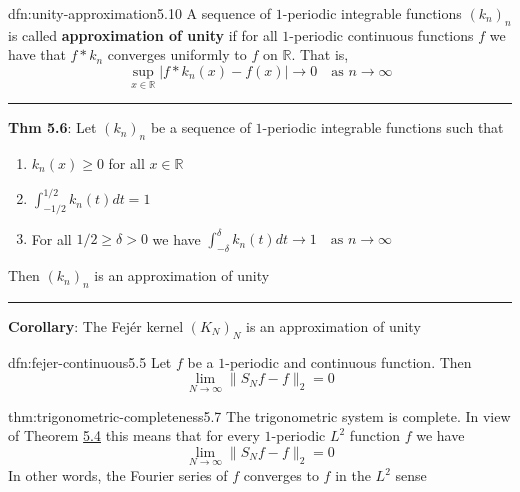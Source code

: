 \documentclass[landscape, 8pt]{extarticle}
\begin{document}
\begin{multicols}{3}
\vspace{-5pt}
\begin{dfn}{dfn:unity-approximation}{5.10}
	\vspace{-5pt}
	A sequence of $1$-periodic integrable functions $(k_{n})_{n}$ is called \textbf{approximation of unity} if for all $1$-periodic continuous functions $f$ we have that $f * k_{n}$ converges uniformly to $f$ on $\mathbb{R}$. That is,
	\[\sup_{x\in\mathbb{R}} \lvert f * k_{n}(x) - f(x) \rvert \to 0 \quad \text{as $n\to\infty$}\]

	\noindent\rule{\textwidth}{0.2pt}
	\textbf{Thm 5.6}: Let $(k_{n})_{n}$ be a sequence of $1$-periodic integrable functions such that
	\vspace{-5pt}
	\begin{enumerate}
	    \item $k_{n}(x) \ge 0$ for all $x\in\mathbb{R}$
	    \item $\int_{-1 /2}^{1 /2} k_{n}(t) dt = 1$
			\vspace{-8pt}
	    \item For all $1 /2 \ge \delta > 0$ we have $\displaystyle\int_{-\delta}^{\delta} k_{n}(t) dt \to 1 \quad\text{as $n\to\infty$}$
	\end{enumerate}

	\vspace{-5pt}
	Then $(k_{n})_{n}$ is an approximation of unity

	\vspace{-5pt}
	\noindent\rule{\textwidth}{0.2pt}
	\textbf{Corollary}: The Fejér kernel $(K_{N})_{N}$ is an approximation of unity
\end{dfn}

\vspace{-5pt}
\begin{lma}[]{dfn:fejer-continuous}{5.5}
	\vspace{-5pt}
	Let $f$ be a $1$-periodic and continuous function. Then
	\[\lim_{N\to \infty} \lVert S_{N} f - f \rVert_{2} = 0\]
\end{lma}

\vspace{-5pt}
\begin{thm}{thm:trigonometric-completeness}{5.7}
	\vspace{-5pt}
	The trigonometric system is complete. In view of Theorem \hyperref[dfn:complete-orthonormal-system]{5.4} this means that for every $1$-periodic $L^{2}$ function $f$ we have
	\[\lim_{N\to \infty} \lVert S_{N} f - f \rVert_{2} = 0\]
	In other words, the Fourier series of $f$ converges to $f$ in the $L^{2}$ sense


\end{thm}
\end{multicols}
\end{document}
